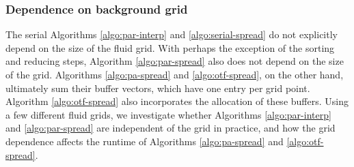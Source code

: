 \subsubsection{Dependence on background grid}\label{sec:grid-dependence}

The serial Algorithms \ref{algo:par-interp} and \ref{algo:serial-spread} do not
explicitly depend on the size of the fluid grid. With perhaps the exception of the
sorting and reducing steps, Algorithm \ref{algo:par-spread} also does not depend on the
size of the grid. Algorithms \ref{algo:pa-spread} and \ref{algo:otf-spread}, on the other
hand, ultimately sum their buffer vectors, which have one entry per grid point. Algorithm
\ref{algo:otf-spread} also incorporates the allocation of these buffers. Using a few
different fluid grids, we investigate whether Algorithms \ref{algo:par-interp} and
\ref{algo:par-spread} are independent of the grid in practice, and how the grid
dependence affects the runtime of Algorithms \ref{algo:pa-spread} and
\ref{algo:otf-spread}.
%

